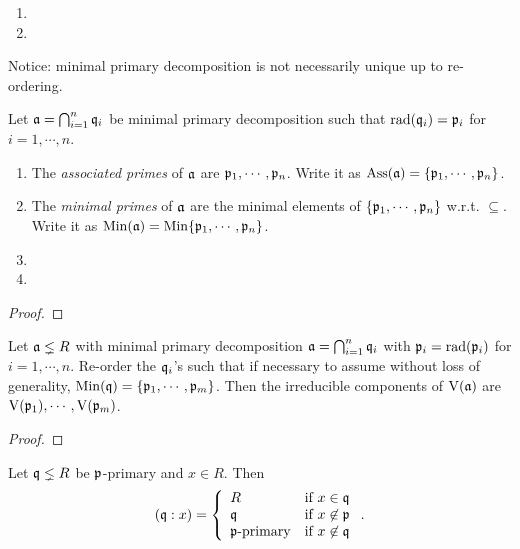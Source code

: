 \begin{example}
    \begin{enumerate}
        \item 
        \item 
    \end{enumerate}
\end{example}

\begin{remark}
    Notice: minimal primary decomposition is not necessarily unique up to re-ordering.
\end{remark}

\begin{definition}
    Let $\mathfrak{a} = \bigcap_{i=1}^{n} \mathfrak{q}_i$ be minimal primary decomposition such that $\operatorname{rad}(\mathfrak{q}_i) = \mathfrak{p}_i$ for $i = 1,\cdots,n$.
    \begin{enumerate}
        \item The \emph{associated primes} of $\mathfrak{a}$ are $\mathfrak{p}_1,\cdots,\mathfrak{p}_n$. Write it as $\operatorname{Ass}(\mathfrak{a}) = \{\mathfrak{p}_1,\cdots,\mathfrak{p}_n\}$.
        \item The \emph{minimal primes} of $\mathfrak{a}$ are the minimal elements of $\{\mathfrak{p}_1,\cdots,\mathfrak{p}_n\}$ w.r.t. $\subseteq$. Write it as $\operatorname{Min}(\mathfrak{a}) = \operatorname{Min}\{\mathfrak{p}_1,\cdots,\mathfrak{p}_n\}$.
        \item 
        \item 
    \end{enumerate}
\end{definition}

\begin{proposition}
\end{proposition}

\begin{proof}
\end{proof}

\begin{proposition}
    Let $\mathfrak{a} \lneq R$ with minimal primary decomposition $\mathfrak{a} = \bigcap_{i=1}^{n} \mathfrak{q}_i$ with $\mathfrak{p}_i = \operatorname{rad}(\mathfrak{p}_i)$ for $i = 1,\cdots,n$. Re-order the $\mathfrak{q}_i$'s such that if necessary to assume without loss of generality, $\operatorname{Min}(\mathfrak{q}) = \{\mathfrak{p}_1,\cdots,\mathfrak{p}_m\}$. Then the irreducible components of $\operatorname{V}(\mathfrak{a})$ are $\operatorname{V}(\mathfrak{p}_1),\cdots,\operatorname{V}(\mathfrak{p}_m)$.
\end{proposition}

\begin{proof}
\end{proof}

\begin{proposition}
    Let $\mathfrak{q} \lneq R$ be $\mathfrak{p}$-primary and $x \in R$. Then 
    \[
        (\mathfrak{q}:x) = \left\{
            \begin{array}{ll}
                R &\text{if }x \in \mathfrak{q} \\
                \mathfrak{q} &\text{if }x \not \in \mathfrak{p} \\
                \mathfrak{p}\text{-primary} &\text{if }x \not \in \mathfrak{q} \\
            \end{array}
        \right..
    \]
\end{proposition}
